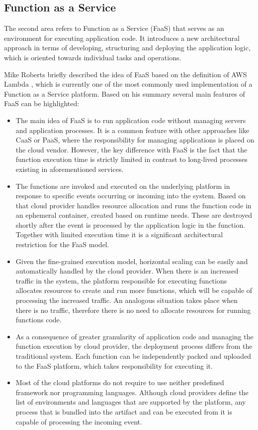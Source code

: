 \subsection{Function as a Service}

The second area refers to Function as a Service (FaaS) that serves as an environment for executing application code. It introduces a new architectural approach in terms of developing, structuring and deploying the application logic, which is oriented towards individual tasks and operations.

Mike Roberts briefly described the idea of FaaS \cite{MartinFowlerServerless} based on the definition of AWS Lambda \cite{AWSLambda}, which is currently one of the most commonly used implementation of a Function as a Service platform. Based on his summary several main features of FaaS can be highlighted:

\begin{itemize}
    \item The main idea of FaaS is to run application code without managing servers and application processes. It is a common feature with other approaches like CaaS or PaaS, where the responsibility for managing applications is placed on the cloud vendor. However, the key difference with FaaS is the fact that the function execution time is strictly limited in contrast to long-lived processes existing in aforementioned services.
    \item The functions are invoked and executed on the underlying platform in response to specific events occurring or incoming into the system. Based on that cloud provider handles resource allocation and runs the function code in an ephemeral container, created based on runtime needs. These are destroyed shortly after the event is processed by the application logic in the function. Together with limited execution time it is a significant architectural restriction for the FaaS model.
    \item Given the fine-grained execution model, horizontal scaling can be easily and automatically handled by the cloud provider. When there is an increased traffic in the system, the platform responsible for executing functions allocates resources to create and run more functions, which will be capable of processing the increased traffic. An analogous situation takes place when there is no traffic, therefore there is no need to allocate resources for running functions code.
    \item As a consequence of greater granularity of application code and managing the function execution by cloud provider, the deployment process differs from the traditional system. Each function can be independently packed and uploaded to the FaaS platform, which takes responsibility for executing it.
    \item Most of the cloud platforms do not require to use neither predefined framework nor programming languages. Although cloud providers define the list of environments and languages that are supported by the platform, any process that is bundled into the artifact and can be executed from it is capable of processing the incoming event.
\end{itemize}

